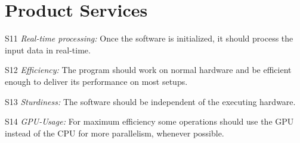 \section{Product Services}

\begin{aims}
	\item[S11] \textit{Real-time processing:} Once the software is initialized, it should process the input data in real-time.
	
	
	\item[S12] \textit{Efficiency:} The program should work on normal hardware and be efficient enough to deliver its performance on most setups. 
	
	\item[S13] \textit{Sturdiness:} The software should be independent of the executing hardware.
	
	\item[S14] \textit{GPU-Usage:} For maximum efficiency some operations should use the GPU instead of the CPU for more parallelism, whenever possible. 
\end{aims}